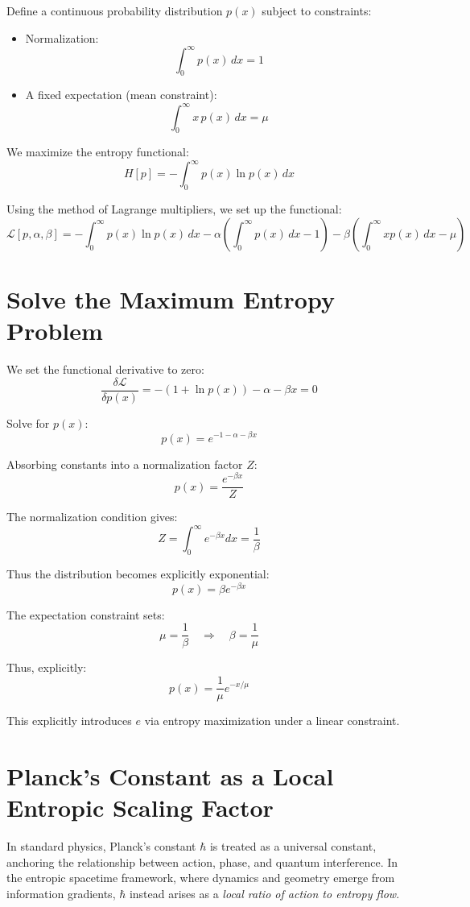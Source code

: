 \documentclass[12pt, a4paper]{article}
\begin{document}
Define a continuous probability distribution \( p(x) \) subject to constraints:

\begin{itemize}
    \item Normalization:
    \[
    \int_0^\infty p(x)\,dx = 1
    \]
    \item A fixed expectation (mean constraint):
    \[
    \int_0^\infty x\, p(x)\, dx = \mu
    \]
\end{itemize}

We maximize the entropy functional:
\[
H[p] = - \int_0^\infty p(x) \ln p(x)\, dx
\]

Using the method of Lagrange multipliers, we set up the functional:
\[
\mathcal{L}[p, \alpha, \beta] = - \int_0^\infty p(x) \ln p(x)\, dx - \alpha \left( \int_0^\infty p(x)\, dx - 1 \right) - \beta \left( \int_0^\infty x p(x)\, dx - \mu \right)
\]

\section*{Solve the Maximum Entropy Problem}

We set the functional derivative to zero:
\[
\frac{\delta \mathcal{L}}{\delta p(x)} = - (1 + \ln p(x)) - \alpha - \beta x = 0
\]

Solve for \( p(x) \):
\[
p(x) = e^{-1 - \alpha - \beta x}
\]

Absorbing constants into a normalization factor \( Z \):
\[
p(x) = \frac{e^{-\beta x}}{Z}
\]

The normalization condition gives:
\[
Z = \int_0^\infty e^{-\beta x} dx = \frac{1}{\beta}
\]

Thus the distribution becomes explicitly exponential:
\[
p(x) = \beta e^{-\beta x}
\]

The expectation constraint sets:
\[
\mu = \frac{1}{\beta} \quad \Rightarrow \quad \beta = \frac{1}{\mu}
\]

Thus, explicitly:
\[
p(x) = \frac{1}{\mu} e^{-x/\mu}
\]

This explicitly introduces \( e \) via entropy maximization under a linear constraint.

\section{Planck’s Constant as a Local Entropic Scaling Factor}

In standard physics, Planck’s constant \( \hbar \) is treated as a universal constant, anchoring the relationship between action, phase, and quantum interference. In the entropic spacetime framework, where dynamics and geometry emerge from information gradients, \( \hbar \) instead arises as a \textit{local ratio of action to entropy flow}. 
\end{document}
